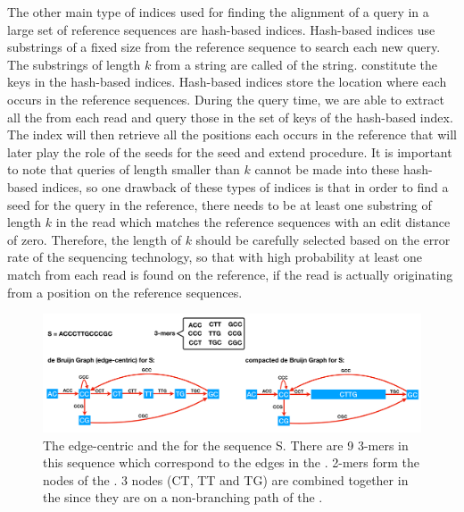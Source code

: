 The other main type of indices used for finding the alignment of a query in a 
large set of reference sequences are hash-based indices. Hash-based indices use 
substrings of a fixed size from the reference sequence to search each new query. 
The substrings of length $k$ from a string are called \kmers of the string. 
\Kmers constitute the keys in the hash-based indices. Hash-based indices store 
the location where each \kmer occurs in the reference sequences. During the 
query time, we are able to extract all the \kmers from each read and query 
those in the set of keys of the hash-based index. The index will then 
retrieve all the positions each \kmer occurs in the reference that will 
later play the role of the seeds for the seed and extend procedure. It is 
important to note that queries of length smaller than $k$ cannot be made into 
these hash-based indices, so one drawback of these types of indices is that in 
order to find a seed for the query  in the reference, there needs to be at 
least one substring of length $k$ in the read which matches the reference sequences 
with an edit distance of zero. Therefore, the length of $k$ should be carefully 
selected based on the error rate of the sequencing technology, so that with high 
probability at least one match from each read is found on the reference, if the 
read is actually originating from a position on the reference sequences.

\begin{figure}
 \centering
 \includegraphics[width=0.95\columnwidth]{Figures/intro/deBruijnGraph.pdf}
 \caption[The edge-centric \dbg]{The edge-centric \dbg and the \cdbg for the 
 sequence S. There are 9 3-mers in this sequence which correspond to the edges 
 in the \dbg. 2-mers form the nodes of the \dbg. 3 nodes (CT, TT and TG) are 
 combined together in the \cdbg since they are on a non-branching path of the 
 \dbg.}
  \label{fig:dbg}
\end{figure}

